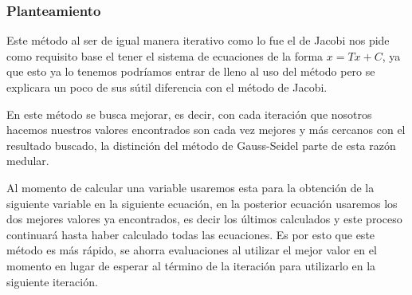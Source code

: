 \documentclass{article}
\begin{document}
\subsubsection{Planteamiento}
Este método al ser de igual manera iterativo como lo fue el de Jacobi nos pide como requisito
base el tener el sistema de ecuaciones de la forma $x = Tx +C$, ya que esto ya lo tenemos podríamos
entrar de lleno al uso del método pero se explicara un poco de sus sútil diferencia con el método de
Jacobi.


En este método se busca mejorar, es decir, con cada iteración que nosotros hacemos nuestros valores
encontrados son cada vez mejores y más cercanos con el resultado buscado, la distinción del método de
Gauss-Seidel parte de esta razón medular.


Al momento de calcular una variable usaremos esta para la obtención de la siguiente variable en la siguiente
ecuación, en la posterior ecuación usaremos los dos mejores valores ya encontrados, es decir los últimos calculados
y este proceso continuará hasta haber calculado todas las ecuaciones. Es por esto que este método es más rápido,
se ahorra evaluaciones al utilizar el mejor valor en el momento en lugar de esperar al término de la iteración
para utilizarlo en la siguiente iteración.
\end{document}
